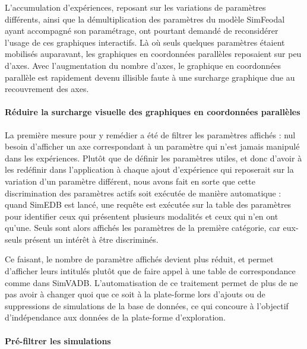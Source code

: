 			L'accumulation d'expériences, reposant sur les variations de paramètres différents, ainsi que la démultiplication des paramètres du modèle SimFeodal ayant accompagné son paramétrage, ont pourtant demandé de reconsidérer l'usage de ces graphiques interactifs.
			Là où seuls quelques paramètres étaient mobilisés auparavant, les graphiques en coordonnées parallèles reposaient sur peu d'axes.
			Avec l'augmentation du nombre d'axes, le graphique en coordonnées parallèle est rapidement devenu illisible faute à une surcharge graphique due au recouvrement des axes.
			
			\paragraph*{Réduire la surcharge visuelle des graphiques en coordonnées parallèles}
			
			La première mesure pour y remédier a été de filtrer les paramètres affichés : nul besoin d'afficher un axe correspondant à un paramètre qui n'est jamais manipulé dans les expériences.
			Plutôt que de définir les paramètres \og utiles\fg{}, et donc d'avoir à les redéfinir dans l'application à chaque ajout d'expérience qui reposerait sur la variation d'un paramètre différent, nous avons fait en sorte que cette discrimination des paramètres \og actifs\fg{} soit exécutée de manière automatique :
			quand SimEDB est lancé, une requête est exécutée sur la table des paramètres pour identifier ceux qui présentent plusieurs modalités et ceux qui n'en ont qu'une.
			Seuls sont alors affichés les paramètres de la première catégorie, car eux-seuls présent un intérêt à être discriminés.
			
			Ce faisant, le nombre de  paramètre affichés devient plus réduit, et permet d'afficher leurs intitulés plutôt que de faire appel à une table de correspondance comme dans SimVADB.
			L'automatisation de ce traitement permet de plus de ne pas avoir à changer quoi que ce soit à la plate-forme lors d'ajouts ou de suppressions de simulations de la base de données, ce qui concoure à l'objectif d'indépendance aux données de la plate-forme d'exploration.
			
			\paragraph*{Pré-filtrer les simulations}
			
